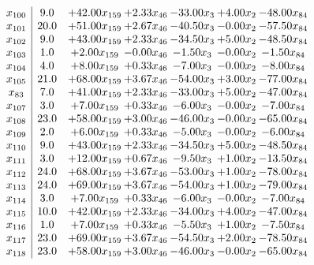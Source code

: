 \documentclass[8pt]{article}
\begin{document}
\[\begin{array}{c| c c@{\hskip 2pt} c@{\hskip 2pt} c@{\hskip 2pt} c@{\hskip 2pt} c@{\hskip 2pt} }
 x_{100}   &  9.0 & + 42.00 x_{159} & +  2.33 x_{46} & -33.00 x_{3} & +  4.00 x_{2} & -48.00 x_{84}\\
 x_{101}   &  20.0 & + 51.00 x_{159} & +  2.67 x_{46} & -40.50 x_{3} & -0.00 x_{2} & -57.50 x_{84}\\
 x_{102}   &  9.0 & + 43.00 x_{159} & +  2.33 x_{46} & -34.50 x_{3} & +  5.00 x_{2} & -48.50 x_{84}\\
 x_{103}   &  1.0 & +  2.00 x_{159} & -0.00 x_{46} & -1.50 x_{3} & -0.00 x_{2} & -1.50 x_{84}\\
 x_{104}   &  4.0 & +  8.00 x_{159} & +  0.33 x_{46} & -7.00 x_{3} & -0.00 x_{2} & -8.00 x_{84}\\
 x_{105}   &  21.0 & + 68.00 x_{159} & +  3.67 x_{46} & -54.00 x_{3} & +  3.00 x_{2} & -77.00 x_{84}\\
 x_{83}   &  7.0 & + 41.00 x_{159} & +  2.33 x_{46} & -33.00 x_{3} & +  5.00 x_{2} & -47.00 x_{84}\\
 x_{107}   &  3.0 & +  7.00 x_{159} & +  0.33 x_{46} & -6.00 x_{3} & -0.00 x_{2} & -7.00 x_{84}\\
 x_{108}   &  23.0 & + 58.00 x_{159} & +  3.00 x_{46} & -46.00 x_{3} & -0.00 x_{2} & -65.00 x_{84}\\
 x_{109}   &  2.0 & +  6.00 x_{159} & +  0.33 x_{46} & -5.00 x_{3} & -0.00 x_{2} & -6.00 x_{84}\\
 x_{110}   &  9.0 & + 43.00 x_{159} & +  2.33 x_{46} & -34.50 x_{3} & +  5.00 x_{2} & -48.50 x_{84}\\
 x_{111}   &  3.0 & + 12.00 x_{159} & +  0.67 x_{46} & -9.50 x_{3} & +  1.00 x_{2} & -13.50 x_{84}\\
 x_{112}   &  24.0 & + 68.00 x_{159} & +  3.67 x_{46} & -53.00 x_{3} & +  1.00 x_{2} & -78.00 x_{84}\\
 x_{113}   &  24.0 & + 69.00 x_{159} & +  3.67 x_{46} & -54.00 x_{3} & +  1.00 x_{2} & -79.00 x_{84}\\
 x_{114}   &  3.0 & +  7.00 x_{159} & +  0.33 x_{46} & -6.00 x_{3} & -0.00 x_{2} & -7.00 x_{84}\\
 x_{115}   &  10.0 & + 42.00 x_{159} & +  2.33 x_{46} & -34.00 x_{3} & +  4.00 x_{2} & -47.00 x_{84}\\
 x_{116}   &  1.0 & +  7.00 x_{159} & +  0.33 x_{46} & -5.50 x_{3} & +  1.00 x_{2} & -7.50 x_{84}\\
 x_{117}   &  23.0 & + 69.00 x_{159} & +  3.67 x_{46} & -54.50 x_{3} & +  2.00 x_{2} & -78.50 x_{84}\\
 x_{118}   &  23.0 & + 58.00 x_{159} & +  3.00 x_{46} & -46.00 x_{3} & -0.00 x_{2} & -65.00 x_{84}\\

\end{array}\]
\end{document}
